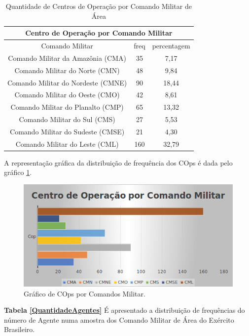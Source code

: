 \begin{table}[H]
\centering
\begin{tabular}{|c | c| c|} 
 \multicolumn{3}{c}{Centro de Operação por Comando Militar}\\ \hline
  Comando Militar & freq  & percentagem \\ [0.5ex] 
 \hline
 Comando Militar da Amazônia (CMA) & 35 & 7,17 \\ 
 \hline
 Comando Militar do Norte (CMN) & 48 & 9,84\\
 \hline
 Comando Militar do Nordeste (CMNE) &  90 & 18,44\\
 \hline
 Comando Militar do Oeste (CMO) & 42 & 8,61\\
 \hline
 Comando Militar do Planalto (CMP) &  65 & 13,32\\
 \hline
 Comando Militar do Sul (CMS) &  27 & 5,53\\
 \hline
 Comando Militar do Sudeste (CMSE) &  21 & 4,30\\
 \hline
 Comando Militar do Leste (CML) &  160 & 32,79\\ [1ex] 
 \hline
\end{tabular}
\caption{Quantidade de Centros de Operação por Comando Militar de Área}
\label{QuantidadeCops}
\end{table}

A representação gráfica da distribuição de frequência dos COps é dada pelo gráfico \ref{figuraCops}.
\begin{figure}[H]
        \centering
        \includegraphics[width=1\textwidth]{Figuras/qtde2_cops.png}
        \caption{Gráfico de COps por Comandos Militar.}
        \label{figuraCops}
\end{figure}

\textbf{Tabela \ref{QuantidadeAgentes}} É apresentado a distribuição de frequências do número de Agente numa amostra dos Comando Militar de Área do Exército Brasileiro. 

